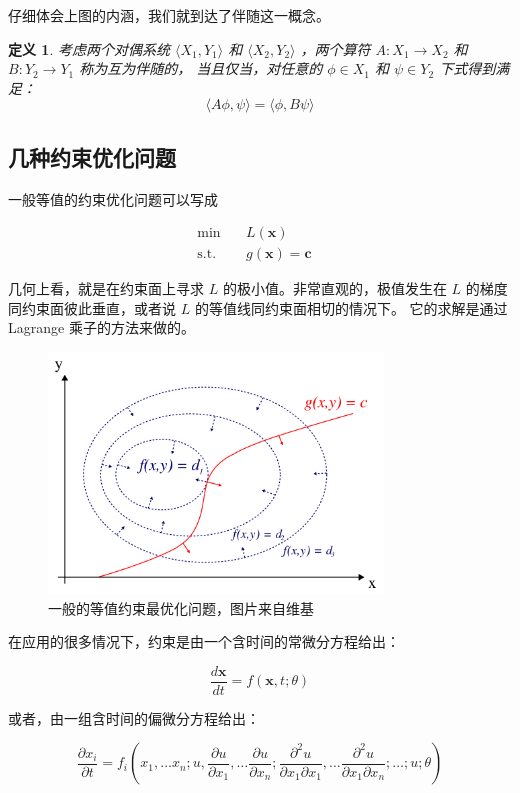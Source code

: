 \documentclass[a4paper,12pt]{article}
\newtheorem{definition}{定义}
\begin{document}
仔细体会上图的内涵，我们就到达了伴随这一概念。

\begin{definition}
\label{d1}
考虑两个对偶系统 $ \langle X_1, Y_1 \rangle $ 和 $ \langle X_2, Y_2 \rangle $ ，两个算符 $ A : X_1 \to X_2$ 和  $B : Y_2 \to Y_1 $ 称为互为伴随的，
当且仅当，对任意的 $ \phi \in X_1 $ 和 $ \psi \in Y_2 $ 下式得到满足：$$ \langle A \phi, \psi \rangle = \langle \phi, B \psi \rangle $$
\end{definition}

\subsection{几种约束优化问题}

一般等值的约束优化问题可以写成

$$
\begin{array}{rcll}
\min &~& L(\mathbf{x}) & \\
\mathrm{s.t.} &~& g(\mathbf{x}) = \mathbf{c}
\end{array}
$$

几何上看，就是在约束面上寻求 $ L $ 的极小值。非常直观的，极值发生在 $ L $ 的梯度同约束面彼此垂直，或者说 $ L $ 的等值线同约束面相切的情况下。
它的求解是通过 Lagrange 乘子的方法来做的。

\begin{figure}[ht]
\centering
\includegraphics[width=3.5in]{images/adjoint/lagrange_multiplier.png}
\caption{一般的等值约束最优化问题，图片来自维基}
\end{figure}

在应用的很多情况下，约束是由一个含时间的常微分方程给出：

$$
\frac{d\mathbf{x}}{dt} = f(\mathbf{x}, t; \theta)
$$

或者，由一组含时间的偏微分方程给出：

$$
\frac{\partial x_i}{\partial t} = f_i \left( x_1, \ldots x_n; u, \frac{\partial u}{\partial x_1}, \ldots \frac{\partial u}{\partial x_n}; \frac{\partial^2 u}{\partial x_1 \partial x_1}, \ldots \frac{\partial^2 u}{\partial x_1 \partial x_n}; \ldots ; u; \theta \right)
$$
\end{document}
